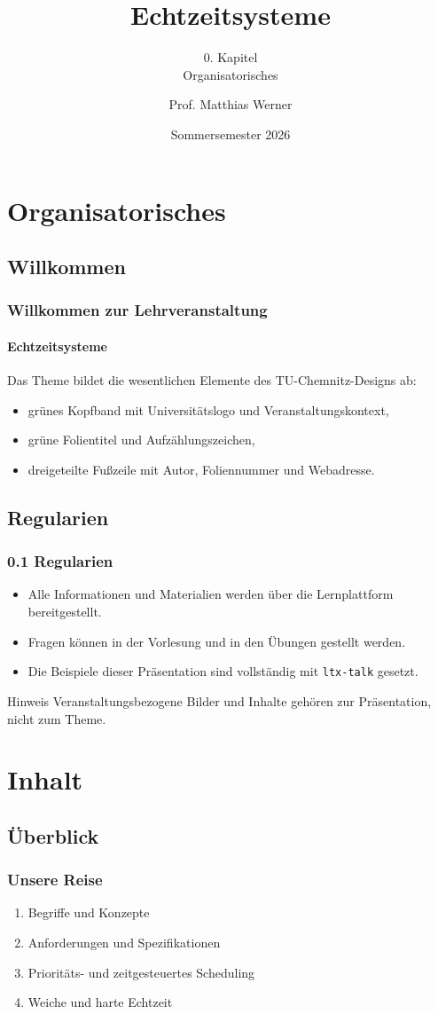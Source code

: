 \documentclass{ltx-talk}
\title{Echtzeitsysteme}
\subtitle{0. Kapitel\\Organisatorisches}
\author{Prof. Matthias Werner}
\institute{Professur Betriebssysteme}
\date{Sommersemester 2026}
\begin{document}
\maketuctitle

\section{Organisatorisches}
\subsection{Willkommen}

\begin{frame}
  \frametitle{Willkommen zur Lehrveranstaltung}
  \framesubtitle{Echtzeitsysteme}

  Das Theme bildet die wesentlichen Elemente des TU-Chemnitz-Designs ab:
  \begin{itemize}
    \item grünes Kopfband mit Universitätslogo und Veranstaltungskontext,
    \item grüne Folientitel und Aufzählungszeichen,
    \item dreigeteilte Fußzeile mit Autor, Foliennummer und Webadresse.
  \end{itemize}
\end{frame}

\subsection{Regularien}

\begin{frame}
  \frametitle{0.1 Regularien}
  \begin{itemize}
    \item Alle Informationen und Materialien werden über die Lernplattform
      bereitgestellt.
    \item Fragen können in der Vorlesung und in den Übungen gestellt werden.
    \item Die Beispiele dieser Präsentation sind vollständig mit
      \texttt{ltx-talk} gesetzt.
  \end{itemize}

  \begin{block}{Hinweis}
    Veranstaltungsbezogene Bilder und Inhalte gehören zur Präsentation, nicht
    zum Theme.
  \end{block}
\end{frame}

\section{Inhalt}
\subsection{Überblick}

\begin{frame}
  \frametitle{Unsere Reise}
  \begin{enumerate}
    \item Begriffe und Konzepte
    \item Anforderungen und Spezifikationen
    \item Prioritäts- und zeitgesteuertes Scheduling
    \item Weiche und harte Echtzeit
  \end{enumerate}
\end{frame}
\end{document}
